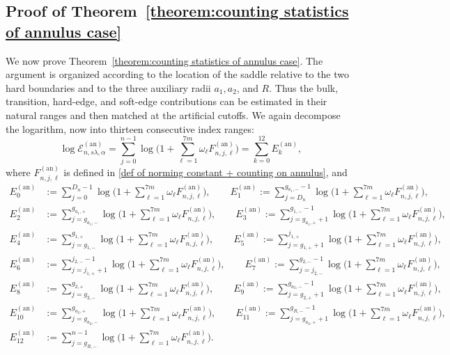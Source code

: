 \documentclass[a4paper]{article}
\numberwithin{equation}{section}
\begin{document}
\subsection{Proof of Theorem~\ref{theorem:counting statistics of annulus case}}
We now prove Theorem~\ref{theorem:counting statistics of annulus case}.  The
argument is organized according to the location of the saddle relative to the
two hard boundaries and to the three auxiliary radii $a_1,a_2$, and $R$.
Thus the bulk, transition, hard-edge, and soft-edge contributions can be
estimated in their natural ranges and then matched at the artificial cutoffs.
We again decompose the logarithm, now into thirteen consecutive index
ranges:
\[
\log \mathcal{E}_{n,s\lambda,\alpha}^{(\mathrm{an})}=
\sum_{j=0}^{n-1}\log\Big( 
1+\sum_{\ell=1}^{7m}\omega_{\ell}F_{n, j,\ell}^{(\mathrm{an})}
\Bigr)
=
\sum_{k=0}^{12}E_k^{(\mathrm{an})},
\]
where $F_{n,j,\ell}^{(\mathrm{an})}$ is defined in
\eqref{def of norming constant + counting on annulus}, and
\begin{align*}
E_0^{(\mathrm{an})}&:=\sum_{j=0}^{D_n-1}\log\Big( 
1+\sum_{\ell=1}^{7m}\omega_{\ell}F_{n,j,\ell}^{(\mathrm{an})}
\Bigr), \qquad
E_1^{(\mathrm{an})}:=\sum_{j=D_n}^{g_{a_1,-}-1}\log\Big( 
1+\sum_{\ell=1}^{7m}\omega_{\ell}F_{n,j,\ell}^{(\mathrm{an})}
\Bigr), \\
E_2^{(\mathrm{an})}&:=\sum_{j=g_{a_1,-}}^{g_{a_1,+}}\log\Big( 
1+\sum_{\ell=1}^{7m}\omega_{\ell}F_{n,j,\ell}^{(\mathrm{an})}
\Bigr),\qquad
E_3^{(\mathrm{an})}:=\sum_{j=g_{a_1,+}+1}^{g_{1,-}-1}\log\Big( 
1+\sum_{\ell=1}^{7m}\omega_{\ell}F_{n,j,\ell}^{(\mathrm{an})}
\Bigr), \\
E_4^{(\mathrm{an})}&:=\sum_{j=g_{1,-}}^{g_{1,+}}\log\Big( 
1+\sum_{\ell=1}^{7m}\omega_{\ell}F_{n,j,\ell}^{(\mathrm{an})}
\Bigr),\qquad
E_5^{(\mathrm{an})}:=\sum_{j=g_{1,+}+1}^{j_{1,+}}\log\Big( 
1+\sum_{\ell=1}^{7m}\omega_{\ell}F_{n,j,\ell}^{(\mathrm{an})}
\Bigr), \\
E_6^{(\mathrm{an})}&:=\sum_{j=j_{1,+}+1}^{j_{2,-}-1}\log\Big( 
1+\sum_{\ell=1}^{7m}\omega_{\ell}F_{n,j,\ell}^{(\mathrm{an})}
\Bigr),\qquad
E_7^{(\mathrm{an})}:=\sum_{j=j_{2,-}}^{g_{2,-}-1}\log\Big( 
1+\sum_{\ell=1}^{7m}\omega_{\ell}F_{n,j,\ell}^{(\mathrm{an})}
\Bigr), 
\\
E_8^{(\mathrm{an})}&:=\sum_{j=g_{2,-}}^{g_{2,+}}\log\Big( 
1+\sum_{\ell=1}^{7m}\omega_{\ell}F_{n,j,\ell}^{(\mathrm{an})}
\Bigr),\qquad
E_9^{(\mathrm{an})}:=\sum_{j=g_{2,+}+1}^{g_{a_2,-}-1}\log\Big( 
1+\sum_{\ell=1}^{7m}\omega_{\ell}F_{n,j,\ell}^{(\mathrm{an})}
\Bigr), \\
E_{10}^{(\mathrm{an})}&:=\sum_{j=g_{a_2,-}}^{g_{a_2,+}}\log\Big( 
1+\sum_{\ell=1}^{7m}\omega_{\ell}F_{n,j,\ell}^{(\mathrm{an})}
\Bigr),\qquad
E_{11}^{(\mathrm{an})}:=\sum_{j=g_{a_2,+}+1}^{g_{R,-}-1}\log\Big( 
1+\sum_{\ell=1}^{7m}\omega_{\ell}F_{n,j,\ell}^{(\mathrm{an})}
\Bigr), 
\\
E_{12}^{(\mathrm{an})}&:=\sum_{j=g_{R,-}}^{n-1}\log\Big( 
1+\sum_{\ell=1}^{7m}\omega_{\ell}F_{n,j,\ell}^{(\mathrm{an})}
\Bigr).
\end{align*}
\end{document}
